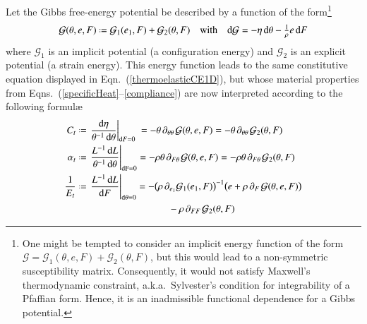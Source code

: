 Let the Gibbs free-energy potential be described by a function of the form\footnote{
    One might be tempted to consider an implicit energy function of the form $\mathcal{G} = \mathcal{G}_1 (\theta ,  e , F ) + \mathcal{G}_2 (\theta , F)$, but this would lead to a non-symmetric susceptibility matrix.  Consequently, it would not satisfy Maxwell's thermo\-dynamic constraint, a.k.a.\ Sylvester's condition for integrability of a Pfaffian form.  Hence, it is an inadmissible functional dependence for a Gibbs potential.
}
\begin{equation}
\mathcal{G} (\theta , e , F) \defeq \mathcal{G}_1 ( e_1 , F ) + \mathcal{G}_2 ( \theta , F )
\quad \text{with} \quad
\mathrm{d} \mathcal{G} = -\eta \, \mathrm{d} \theta - 
\tfrac{1}{\rho} e \, \mathrm{d} F
\label{GibbsFreeEnergy}
\end{equation}
where $\mathcal{G}_1$ is an implicit potential (a configuration energy) and $\mathcal{G}_2$ is an explicit potential (a strain energy).  This energy function leads to the same constitutive equation displayed in Eqn.~(\ref{thermoelasticCE1D}), but whose material properties from Eqns.~(\ref{specificHeat}--\ref{compliance}) are now interpreted according to the following formul\ae
\begin{subequations}
    \label{physicalFields1Dfiber}
    \begin{align}
    C_t & \defeq 
    \left. \frac{\mathrm{d} \eta}{\theta^{-1} \, \mathrm{d} \theta} 
    \right|_{\mathrm{d}F=0} \; =
    -\theta \, \partial_{\theta\theta\,} \mathcal{G} ( \theta , e , F ) = 
    -\theta \, \partial_{\theta\theta\,} \mathcal{G}_2(\theta , F)
    \label{specificHeat1D} \\
    \alpha_t & \defeq
    \left. \frac{L^{-1} \, \mathrm{d}L}
    {\theta^{-1} \, \mathrm{d}\theta} \right|_{\mathrm{dF=0}} =
    -\rho\theta \, \partial_{F\theta\,} \mathcal{G} (\theta , e , F) =
    -\rho\theta \, \partial_{F\theta\,} \mathcal{G}_2(\theta , F)
    \label{thermalExpansion1D} \\
    \frac{1}{E_t} & \defeq 
    \left. \frac{L^{-1} \, \mathrm{d}L}{\mathrm{d}F}
    \right|_{\mathrm{d}\theta=0} = -
    \bigl( \rho \, \partial_{e_1} \mathcal{G}_1 ( e_1 , F ) \bigr)^{-1} 
    \bigl( e + \rho \, \partial_{F\,} \mathcal{G} (\theta , e , F) \bigr) \notag \\ \mbox{} & \hspace{33mm} -
    \rho \, \partial_{FF\,} \mathcal{G}_2(\theta , F)
    \label{compliance1D}
    \end{align}
\end{subequations}
